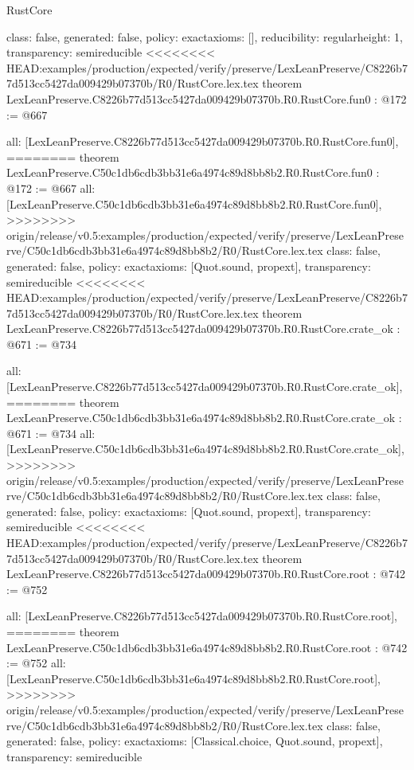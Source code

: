 \begin{lexlean}{RustCore}
\begin{coremodule}
{\begin{coremodule}
{{{  class: false,
  generated: false,
  policy: exact{axioms: []},
  reducibility: regular{height: 1},
  transparency: semireducible
}
<<<<<<<< HEAD:examples/production/expected/verify/preserve/LexLeanPreserve/C8226b77d513cc5427da009429b07370b/R0/RustCore.lex.tex
theorem LexLeanPreserve.C8226b77d513cc5427da009429b07370b.R0.RustCore.fun0 : @172 := @667 {
  all: [LexLeanPreserve.C8226b77d513cc5427da009429b07370b.R0.RustCore.fun0],
========
theorem LexLeanPreserve.C50c1db6cdb3bb31e6a4974c89d8bb8b2.R0.RustCore.fun0 : @172 := @667 {
  all: [LexLeanPreserve.C50c1db6cdb3bb31e6a4974c89d8bb8b2.R0.RustCore.fun0],
>>>>>>>> origin/release/v0.5:examples/production/expected/verify/preserve/LexLeanPreserve/C50c1db6cdb3bb31e6a4974c89d8bb8b2/R0/RustCore.lex.tex
  class: false,
  generated: false,
  policy: exact{axioms: [Quot.sound, propext]},
  transparency: semireducible
}
<<<<<<<< HEAD:examples/production/expected/verify/preserve/LexLeanPreserve/C8226b77d513cc5427da009429b07370b/R0/RustCore.lex.tex
theorem LexLeanPreserve.C8226b77d513cc5427da009429b07370b.R0.RustCore.crate_ok : @671 := @734 {
  all: [LexLeanPreserve.C8226b77d513cc5427da009429b07370b.R0.RustCore.crate_ok],
========
theorem LexLeanPreserve.C50c1db6cdb3bb31e6a4974c89d8bb8b2.R0.RustCore.crate_ok : @671 := @734 {
  all: [LexLeanPreserve.C50c1db6cdb3bb31e6a4974c89d8bb8b2.R0.RustCore.crate_ok],
>>>>>>>> origin/release/v0.5:examples/production/expected/verify/preserve/LexLeanPreserve/C50c1db6cdb3bb31e6a4974c89d8bb8b2/R0/RustCore.lex.tex
  class: false,
  generated: false,
  policy: exact{axioms: [Quot.sound, propext]},
  transparency: semireducible
}
<<<<<<<< HEAD:examples/production/expected/verify/preserve/LexLeanPreserve/C8226b77d513cc5427da009429b07370b/R0/RustCore.lex.tex
theorem LexLeanPreserve.C8226b77d513cc5427da009429b07370b.R0.RustCore.root : @742 := @752 {
  all: [LexLeanPreserve.C8226b77d513cc5427da009429b07370b.R0.RustCore.root],
========
theorem LexLeanPreserve.C50c1db6cdb3bb31e6a4974c89d8bb8b2.R0.RustCore.root : @742 := @752 {
  all: [LexLeanPreserve.C50c1db6cdb3bb31e6a4974c89d8bb8b2.R0.RustCore.root],
>>>>>>>> origin/release/v0.5:examples/production/expected/verify/preserve/LexLeanPreserve/C50c1db6cdb3bb31e6a4974c89d8bb8b2/R0/RustCore.lex.tex
  class: false,
  generated: false,
  policy: exact{axioms: [Classical.choice, Quot.sound, propext]},
  transparency: semireducible
}

}}}}}
\end{coremodule}}
\end{coremodule}
\end{lexlean}
